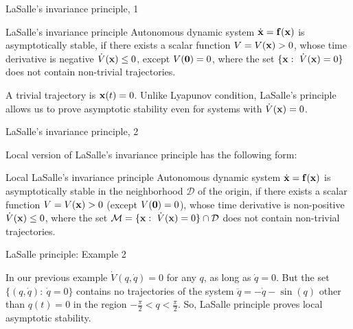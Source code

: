 \documentclass{beamer}
\begin{document}
\begin{frame}{LaSalle's invariance principle, 1}
	\begin{flushleft}
		
		\begin{block}{LaSalle's invariance principle}
			Autonomous dynamic system $\dot{\mathbf{x}} = \mathbf{f}(\mathbf{x})$ is asymptotically stable, if there exists a scalar function $V = V(\mathbf{x}) > 0$, whose time derivative is negative $\dot V(\mathbf{x}) \leq 0$, except $V(\mathbf{0}) = 0$, where the set $\{\mathbf{x}: \   \dot V(\mathbf{x}) = 0  \}$ does not contain non-trivial trajectories.
		\end{block}
	
		\bigskip
		
		A trivial trajectory is $\mathbf{x}(t) = 0$. Unlike Lyapunov condition, LaSalle's principle allows us to prove asymptotic stability even for systems with $\dot V(\mathbf{x}) = 0$.
		
		
	\end{flushleft}
\end{frame}




\begin{frame}{LaSalle's invariance principle, 2}
	\begin{flushleft}
		
		Local version of LaSalle's invariance principle has the following form:
		
		\begin{block}{Local LaSalle's invariance principle}
			Autonomous dynamic system $\dot{\mathbf{x}} = \mathbf{f}(\mathbf{x})$ is asymptotically stable in the neighborhood $\mathcal D$ of the origin, if there exists a scalar function $V = V(\mathbf{x}) > 0$ (except $V(\mathbf{0}) = 0$), whose time derivative is non-positive $\dot V(\mathbf{x}) \leq 0$, where the set $\mathcal M = \{\mathbf{x}: \   \dot V(\mathbf{x}) = 0  \} \cap \mathcal D$ does not contain non-trivial trajectories.
		\end{block}
		
		
	\end{flushleft}
\end{frame}



\begin{frame}{LaSalle principle: Example 2}
	\begin{flushleft}
		
			In our previous example $\dot V(q, \dot{q}) = 0$ for any $q$, as long as $\dot{q} = 0$. But the set $\{(q, \dot{q}): \   \dot{q} = 0 \}$ contains no trajectories of the system $\ddot{q}  = -\dot{q} - \sin(q)$ other than $q(t) = 0$ in the region $-\frac{\pi}{2} < q < \frac{\pi}{2}$. So, LaSalle principle proves local asymptotic stability.
		
	\end{flushleft}
\end{frame}
\end{document}
